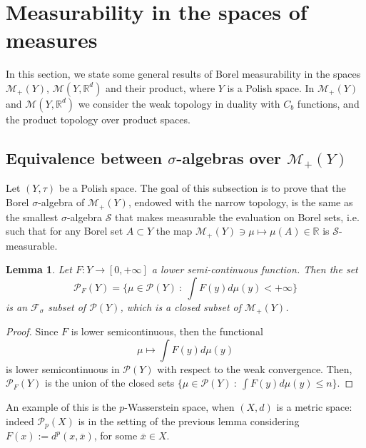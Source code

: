 \documentclass[10pt,leqno]{amsart}
\numberwithin{equation}{section}
\newtheorem{lemma}[teorema]{Lemma}
\newcommand{\R}{\mathbb{R}}
\newcommand{\PP}{\mathcal{P}}
\begin{document}
\section{Measurability in the spaces of measures}\label{app: measurability}
In this section, we state some general results of Borel measurability in the spaces $\mathcal{M}_+(Y)$, $\mathcal{M}(Y,\R^d)$ and their product, where $Y$ is a Polish space. In $\mathcal{M}_+(Y)$ and $\mathcal{M}(Y,\R^d)$ we consider the weak topology in duality with $C_b$ functions, and the product topology over product spaces.

\subsection{Equivalence between \texorpdfstring{$\sigma$}{}-algebras over \texorpdfstring{$\mathcal{M}_+(Y)$}{}}

Let $(Y,\tau)$ be a Polish space. The goal of this subsection is to prove that the Borel $\sigma$-algebra of $\mathcal{M}_+(Y)$, endowed with the narrow topology, is the same as the smallest $\sigma$-algebra $\mathcal{S}$ that makes measurable the evaluation on Borel sets, i.e. such that for any Borel set $A\subset Y$ the map $\mathcal{M}_+(Y) \ni \mu \mapsto \mu(A) \in \R$ is $\mathcal{S}$-measurable.



\iffalse

\begin{lemma}
    Let $F:Y\to[0,+\infty]$ a lower semi-continuous function. Then the set 
    \begin{equation}
        \PP_F(Y) = \{\mu \in \PP(Y) \ : \ \int F(y) d\mu(y) <+\infty\}
    \end{equation}
    is an $\mathcal{F}_\sigma$ subset of $\PP(Y)$, which is a closed subset of $\mathcal{M}_+(Y)$.
\end{lemma}

\begin{proof}
    Since $F$ is lower semicontinuous, then the functional 
    \[\mu \mapsto \int F(y) d\mu(y)\]
    is lower semicontinuous in $\PP(Y)$ with respect to the weak convergence. Then, $\PP_F(Y)$ is the union of the closed sets $\{\mu \in \PP(Y) \ : \  \int F(y) d\mu(y) \leq n \}$.
\end{proof}

An example of this is the $p$-Wasserstein space, when $(X,d)$ is a metric space: indeed $\PP_p(X) $ is in the setting of the previous lemma considering $F(x) := d^p(x,\overline{x})$, for some $\overline{x} \in X$.
\end{document}
